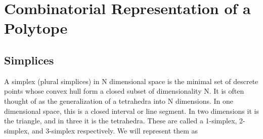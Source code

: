 \section{Combinatorial Representation of a Polytope}

\subsection{Simplices}

A simplex (plural simplices) in N dimensional space is the minimal set of
descrete points whose convex hull form a closed subset of dimensionality N.
It is often thought
of as the generalization of a tetrahedra into N dimensions. In one dimensional
space, this is a closed interval or line segment. In two dimensions it is the
triangle, and in three it is the tetrahedra. These are called a 1-simplex,
2-simplex, and 3-simplex respectively. We will represent them as 



